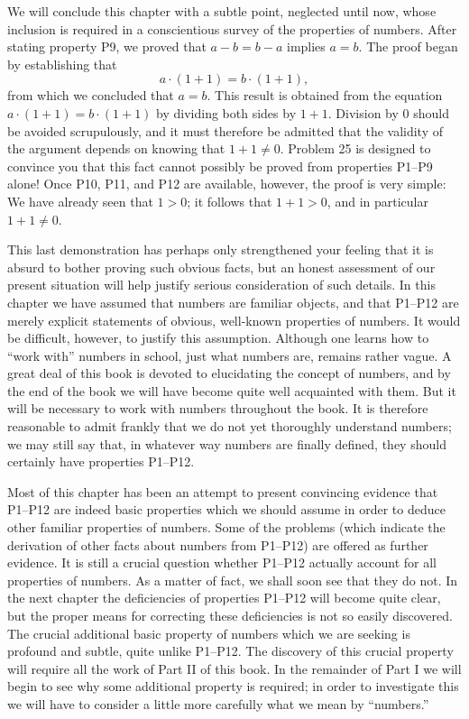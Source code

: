 We will conclude this chapter with a subtle point, neglected until now, whose
inclusion is required in a conscientious survey of the properties of numbers.
After stating property P9, we proved that $a-b=b-a$ implies $a=b$. The proof
began by establishing that
\[ a \cdot (1+1) = b \cdot (1+1), \]
from which we concluded that $a=b$. This result is obtained from the equation
$a \cdot (1+1) = b \cdot (1+1)$ by dividing both sides by $1+1$. Division by
$0$ should be avoided scrupulously, and it must therefore be admitted that the
validity of the argument depends on knowing that $1+1 \neq 0$. Problem 25 is
designed to convince you that this fact cannot possibly be proved from
properties P1--P9 alone! Once P10, P11, and P12 are available, however, the
proof is very simple: We have already seen that $1>0$; it follows that
$1+1>0$, and in particular $1+1 \neq 0$.

This last demonstration has perhaps only strengthened your feeling that it is
absurd to bother proving such obvious facts, but an honest assessment of our
present situation will help justify serious consideration of such details. In
this chapter we have assumed that numbers are familiar objects, and that
P1--P12 are merely explicit statements of obvious, well-known properties of
numbers. It would be difficult, however, to justify this assumption. Although
one learns how to ``work with'' numbers in school, just what numbers are,
remains rather vague. A great deal of this book is devoted to elucidating the
concept of numbers, and by the end of the book we will have become quite well
acquainted with them. But it will be necessary to work with numbers
throughout the book. It is therefore reasonable to admit frankly that we do
not yet thoroughly understand numbers; we may still say that, in whatever way
numbers are finally defined, they should certainly have properties P1--P12.

Most of this chapter has been an attempt to present convincing evidence that
P1--P12 are indeed basic properties which we should assume in order to deduce
other familiar properties of numbers. Some of the problems (which indicate
the derivation of other facts about numbers from P1--P12) are offered as
further evidence. It is still a crucial question whether P1--P12 actually
account for all properties of numbers. As a matter of fact, we shall soon see
that they do not. In the next chapter the deficiencies of properties P1--P12
will become quite clear, but the proper means for correcting these
deficiencies is not so easily discovered. The crucial additional basic
property of numbers which we are seeking is profound and subtle, quite unlike
P1--P12. The discovery of this crucial property will require all the work of
Part II of this book. In the remainder of Part I we will begin to see why
some additional property is required; in order to investigate this we will
have to consider a little more carefully what we mean by ``numbers.''

